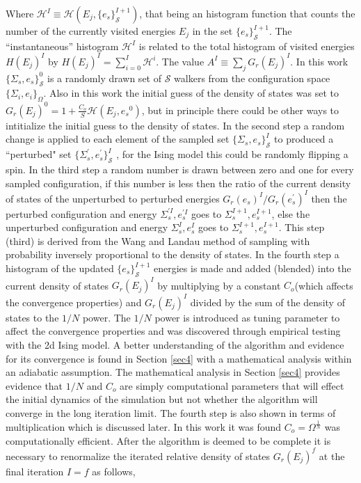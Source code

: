 \documentclass[aps,pre,reprint,superscriptaddress,showkeys]{revtex4-2}
\begin{document}
Where  $\mathcal{H}^I \equiv \mathcal{H}(E_j,\{e_s\}_{\mathcal{S}}^{I+1})$, that being an  histogram function that counts the number of the currently visited energies $E_j$ in the set $\{e_s\}_{\mathcal{S}}^{I+1}$. The ``instantaneous'' histogram $\mathcal{H}^I$ is related to the total histogram of visited energies $H(E_j)^I$ by $H(E_j)^I = \sum_{i=0}^{I}\mathcal{H}^i$. The value $A^I \equiv \sum_jG_r(E_j)^I$.  In this work $\{\Sigma_{s},e_s\}_{\mathcal{S}}^0$  is a randomly drawn set of $\mathcal{S}$ walkers from the configuration space $\{ \Sigma_i, e_i \}_\Omega $. Also in this work the initial guess of the density of states was set to $G_{r}(E_j)^0 = 1 +  \frac{C_o}{S}\mathcal{H}(E_j,{e_s}^0)$, but in principle there could be other ways to intitialize the initial guess to the density of states. In the second step  a random change is applied to each element of the sampled set $\{\Sigma_{s},e_s\}_{\mathcal{S}}^I$ to produced a ``perturbed" set $ \{\Sigma_{s}^{'},e_s^{'}\}_{\mathcal{S}}^I$ , for the Ising model this could be randomly flipping a spin.  In the third step a random number is drawn between zero and one for every sampled configuration, if this number is less then the ratio of the current density of states of the unperturbed to perturbed energies $G_{r}(e_s)^{I}/G_{r}(e_s^{'})^{I}$ then the perturbed configuration and energy  $\Sigma_{s}^{'I},e_s^{'I}$  goes to $\Sigma_{s}^{I+1},e_s^{I+1}$,  else the unperturbed configuration and energy $\Sigma_{s}^{I},e_s^I$  goes to $\Sigma_{s}^{I+1},e_s^{I+1}$. This step (third) is derived from the Wang and Landau method of sampling with probability inversely proportional to the density of states.  In the fourth step a histogram of the updated $\{ e_s \}^{I+1}_{\mathcal{S}}$ energies is made and added (blended) into the current density of states $G_{r}(E_j)^I$   by multiplying  by a constant $C_{o}$(which affects the convergence properties) and   $G_{r}(E_j)^{I}$ divided by the sum of the density of states to the $1/N$ power. The $1/N$ power is introduced as tuning parameter to affect the convergence properties and was discovered through empirical testing with the 2d Ising model. A better understanding of the algorithm and evidence for its convergence is found in Section \ref{sec4} with a mathematical analysis within an adiabatic assumption.  The mathematical analysis in Section \ref{sec4} provides evidence that $1/N$ and $C_{o}$ are simply computational parameters that will effect the initial dynamics of the simulation but not whether the algorithm will converge in the long iteration limit. The fourth step is also shown in terms of multiplication which is discussed later. In this work it was found  $C_{o}=\Omega^{\frac{1}{N}}$ was computationally efficient. After the algorithm is deemed to be complete it is necessary to renormalize the iterated relative density of states $G_{r}(E_j)^f$ at the final iteration $I=f$ as follows, 
\end{document}

